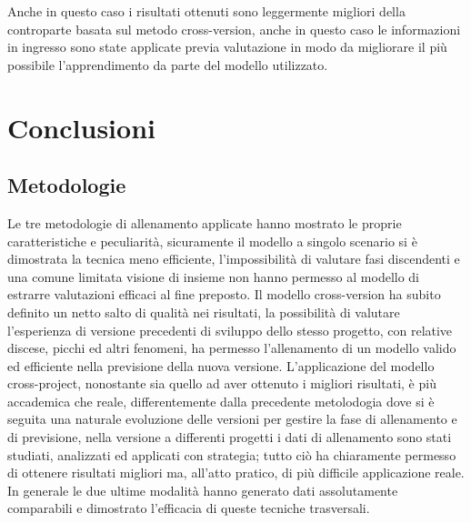 \documentclass[%
    corpo=12pt,
    twoside,
    oldstyle,
    autoretitolo,
    greek,
    evenboxes,
]{toptesi}
\begin{document}
Anche in questo caso i risultati ottenuti sono leggermente migliori della controparte basata sul metodo cross-version, anche in questo caso le informazioni in ingresso sono state applicate previa valutazione in modo da migliorare il più possibile l'apprendimento da parte del modello utilizzato.



\chapter{Conclusioni}
\section{Metodologie}
Le tre metodologie di allenamento applicate hanno mostrato le proprie caratteristiche e peculiarità, sicuramente il modello a singolo scenario si è dimostrata la tecnica meno efficiente, l'impossibilità di valutare fasi discendenti e una comune limitata visione di insieme non hanno permesso al modello di estrarre valutazioni efficaci al fine preposto. Il modello cross-version ha subito definito un netto salto di qualità nei risultati, la possibilità di valutare l'esperienza di versione precedenti di sviluppo dello stesso progetto, con relative discese, picchi ed altri fenomeni, ha permesso l'allenamento di un modello valido ed efficiente nella previsione della nuova versione. L'applicazione del modello cross-project, nonostante sia quello ad aver ottenuto i migliori risultati, è più accademica che reale, differentemente dalla precedente metolodogia dove si è seguita una naturale evoluzione delle versioni per gestire la fase di allenamento e di previsione, nella versione a differenti progetti i dati di allenamento sono stati studiati, analizzati ed applicati con strategia; tutto ciò ha chiaramente permesso di ottenere risultati migliori ma, all'atto pratico, di più difficile applicazione reale. In generale le due ultime modalità hanno generato dati assolutamente comparabili e dimostrato l'efficacia di queste tecniche trasversali.
\end{document}
